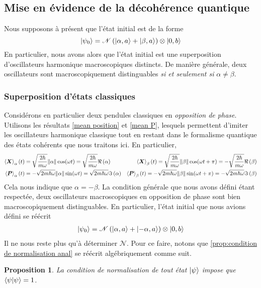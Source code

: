 \documentclass[11pt,oneside,a4paper]{article}
\newcommand{\h}{\ensuremath{\hbar}}
\newtheorem{property}[theorem]{Proposition}
\begin{document}
\subsection{Mise en évidence de la décohérence quantique}
Nous supposons à présent que l'état initial est de la forme
\begin{equation}
  \ket{\psi_0} = \mathcal{N}\left(\ket{\alpha,a}+\ket{\beta,a}\right)\otimes\ket{0,b}\label{eq:quantum decoherence initial state}
\end{equation}
En particulier, nous avons alors que l'état initial est une superposition d'oscillateurs harmonique macroscopiques distincts. De manière générale, deux oscillateurs sont macroscopiquement distinguables \emph{si et seulement si} $\alpha\neq\beta$.
\subsubsection{Superposition d'états classiques}
Considérons en particulier deux pendules classiques en \emph{opposition de phase}. Utilisons les résultats \eqref{mean position} et \eqref{mean P}, lesquels permettent d'imiter les oscillateurs harmonique classique tout en restant dans le formalisme quantique des états cohérents que nous traitons ici. En particulier,
\begin{align*}
  \expval{\bm{X}}_\alpha (t) &= \sqrt{\frac{2\h}{m\omega}}\norm{\alpha}\cos(\omega t) = \sqrt{\frac{2\h}{m\omega}}\real \left(\alpha\right)&\expval{\bm{X}}_\beta (t) = \sqrt{\frac{2\h}{m\omega}}\norm{\beta}\cos(\omega t+\pi)=-\sqrt{\frac{2\h}{m\omega}}\real \left(\beta\right)\\
  \expval{\bm{P}}_\alpha (t) &= -\sqrt{2m\h\omega}\norm{\alpha}\sin(\omega t)=\sqrt{2m\h\omega}\imaginary \left(\alpha\right) &\expval{\bm{P}}_\beta (t) = -\sqrt{2m\h\omega}\norm{\beta}\sin(\omega t+\pi) = -\sqrt{2m\h\omega}\imaginary\left(\beta\right)
\end{align*}
Cela nous indique que $\alpha=-\beta$. La condition générale que nous avons défini étant respectée, deux oscillateurs macroscopiques en opposition de phase sont bien macroscopiquement distinguables. En particulier, l'état initial que nous avions défini se réécrit
\begin{align*}
  \ket{\psi_0} = \mathcal{N}\left(\ket{\alpha,a}+\ket{-\alpha,a}\right)\otimes\ket{0,b}
\end{align*}
Il ne nous reste plus qu'à déterminer $\mathcal{N}$. Pour ce faire, notons que \ref{prop:condition de normalisation anal} se réécrit algébriquement comme suit.
\begin{property}
  La condition de normalisation de tout état $\ket{\psi}$ impose que $\braket{\psi} = 1$.
\end{property}
\end{document}
